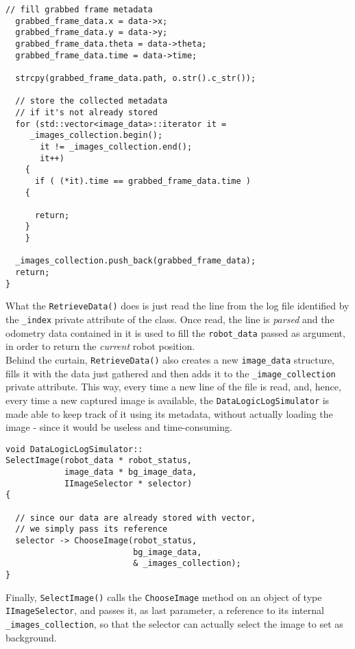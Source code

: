 \begin{lstlisting}[caption={\texttt{DataLogicLogSimulator::RetrieveData()} method},
    label={code:datalogiclogsimulator:retrievedata}]
  // fill grabbed frame metadata
  grabbed_frame_data.x = data->x;
  grabbed_frame_data.y = data->y;
  grabbed_frame_data.theta = data->theta;
  grabbed_frame_data.time = data->time;

  strcpy(grabbed_frame_data.path, o.str().c_str());

  // store the collected metadata 
  // if it's not already stored
  for (std::vector<image_data>::iterator it =
	 _images_collection.begin();
       it != _images_collection.end();
       it++)
    {
      if ( (*it).time == grabbed_frame_data.time )
	{

	  return;
	}
    }

  _images_collection.push_back(grabbed_frame_data);
  return;
}
\end{lstlisting}

What the \texttt{RetrieveData()} does is just read the line from the log 
file identified by the \texttt{\_index} private attribute of the class.
Once read, the line is \textit{parsed} and the odometry data contained 
in it is used to fill the \texttt{robot\_data} passed as argument, in 
order to return the \textit{current} robot position.
\\
Behind the curtain, \texttt{RetrieveData()} also creates a new 
\texttt{image\_data} structure, fills it with the data just 
gathered and then adds it to the \texttt{\_image\_collection} 
private attribute.
This way, every time a new line of the file is read, and, hence, 
every time a new captured image is available, the \texttt{DataLogicLogSimulator} 
is made able to keep track of it using its metadata, without actually 
loading the image - since it would be useless and time-consuming.
\\
\begin{lstlisting}[caption={\texttt{DataLogicLogSimulator::SelectImage()} method},
    label={code:datalogiclogsimulator:selectimage}]
void DataLogicLogSimulator::
SelectImage(robot_data * robot_status,
            image_data * bg_image_data,
            IImageSelector * selector)
{

  // since our data are already stored with vector,
  // we simply pass its reference
  selector -> ChooseImage(robot_status, 
                          bg_image_data, 
                          & _images_collection);
}
\end{lstlisting}

Finally, \texttt{SelectImage()} calls the \texttt{ChooseImage} method 
on an object of type \texttt{IImageSelector}, and passes it, as last 
parameter, a reference to its internal \texttt{\_images\_collection}, 
so that the selector can actually select the image to set as 
background.


